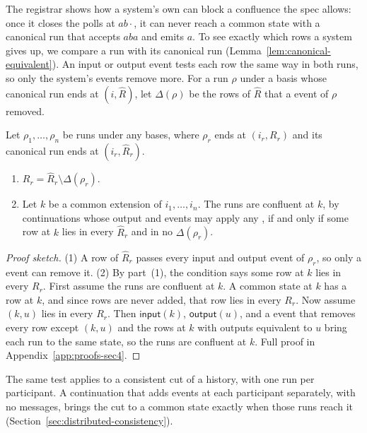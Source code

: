 The registrar shows how a system's own \commitment can block a confluence the
spec allows: once it closes the polls at $ab\cdot$, it can never reach a common
state with a canonical run that accepts $aba$ and emits $a$.  To see exactly
which rows a system gives up, we compare a run with its canonical run
(Lemma~\ref{lem:canonical-equivalent}).  An input or output event tests each
row the same way in both runs, so only the system's \commitment events remove
more.  For a run $\rho$ under a basis whose canonical run ends at
$(i,\widehat R)$, let $\Delta(\rho)$ be the rows of $\widehat R$ that a
\commitment event of $\rho$ removed.

\begin{proposition}
\label{prop:system-confluence}
Let $\rho_1,\ldots,\rho_n$ be runs under any \commitment bases, where $\rho_r$
ends at $(i_r,R_r)$ and its canonical run ends at $(i_r,\widehat R_r)$.
\begin{enumerate}
  \item $R_r=\widehat R_r\setminus\Delta(\rho_r)$.
  \item Let $k$ be a common extension of $i_1,\ldots,i_n$.  The runs are
        confluent at $k$, by continuations whose output and \commitment events
        may apply any \commitments, if and only if some row at $k$ lies in
        every $\widehat R_r$ and in no $\Delta(\rho_r)$.
\end{enumerate}
\end{proposition}

\begin{proof}[Proof sketch]
(1) A row of $\widehat R_r$ passes every input and output event of $\rho_r$,
so only a \commitment event can remove it.  (2) By part~(1), the condition says
some row at $k$ lies in every $R_r$.  First assume the runs are confluent at
$k$.  A common state at $k$ has a row at $k$, and since rows are never added,
that row lies in every $R_r$.  Now assume $(k,u)$ lies in every $R_r$.  Then
$\mathsf{input}(k)$, $\mathsf{output}(u)$, and a \commitment event that removes
every row except $(k,u)$ and the rows at $k$ with outputs equivalent to $u$
bring each run to the same state, so the runs are confluent at $k$.  Full proof in Appendix~\ref{app:proofs-sec4}.
\end{proof}

The same test applies to a consistent cut of a history, with one run per
participant.  A continuation that adds events at each participant separately,
with no messages, brings the cut to a common state exactly when those runs
reach it (Section~\ref{sec:distributed-consistency}).

